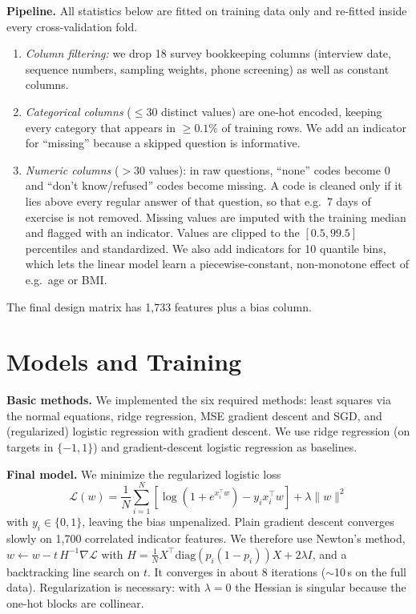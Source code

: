 \documentclass[10pt,conference,compsocconf]{IEEEtran}
\begin{document}
\textbf{Pipeline.} All statistics below are fitted on training data only and
re-fitted inside every cross-validation fold.
\begin{enumerate}
\item \emph{Column filtering:} we drop 18 survey bookkeeping columns
(interview date, sequence numbers, sampling weights, phone screening) as well
as constant columns.
\item \emph{Categorical columns} ($\le 30$ distinct values) are one-hot encoded,
keeping every category that appears in $\ge 0.1\%$ of training rows. We add
an indicator for ``missing'' because a skipped question is informative.
\item \emph{Numeric columns} ($>30$ values): in raw questions, ``none'' codes
become 0 and ``don't know/refused'' codes become missing. A code is cleaned
only if it lies above every regular answer of that question, so that
e.g.\ 7 days of exercise is not removed. Missing values are imputed with the
training median and flagged with an indicator. Values are clipped to the
$[0.5, 99.5]$ percentiles and standardized. We also add indicators for 10
quantile bins, which lets the linear model learn a piecewise-constant,
non-monotone effect of e.g.\ age or BMI.
\end{enumerate}
The final design matrix has 1{,}733 features plus a bias column.

\section{Models and Training}
\textbf{Basic methods.} We implemented the six required methods: least squares
via the normal equations, ridge regression, MSE gradient descent and SGD, and
(regularized) logistic regression with gradient descent. We use ridge
regression (on targets in $\{-1,1\}$) and gradient-descent logistic
regression as baselines.

\textbf{Final model.} We minimize the regularized logistic loss
\[
\mathcal{L}(w)=\frac{1}{N}\sum_{i=1}^{N}\left[\log\!\left(1+e^{x_i^\top w}\right)-y_i x_i^\top w\right]+\lambda\lVert w\rVert^2
\]
with $y_i\in\{0,1\}$, leaving the bias unpenalized. Plain gradient descent
converges slowly on 1{,}700 correlated indicator features. We therefore use
Newton's method, $w\leftarrow w-t\,H^{-1}\nabla\mathcal{L}$ with
$H=\frac1N X^\top\mathrm{diag}(p_i(1-p_i))X+2\lambda I$, and a backtracking
line search on $t$. It converges in about 8 iterations ($\sim$10\,s on the
full data). Regularization is necessary: with $\lambda=0$ the Hessian is
singular because the one-hot blocks are collinear.
\end{document}
